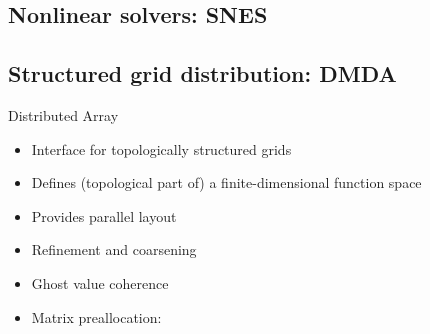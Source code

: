 \subsection{Nonlinear solvers: SNES}





\subsection{Structured grid distribution: DMDA}
\begin{frame}{Distributed Array}
  \begin{itemize}
  \item Interface for topologically structured grids
  \item Defines (topological part of) a finite-dimensional function space
  \item Provides parallel layout
  \item Refinement and coarsening
  \item Ghost value coherence
  \item Matrix preallocation: 
  \end{itemize}
\end{frame}











